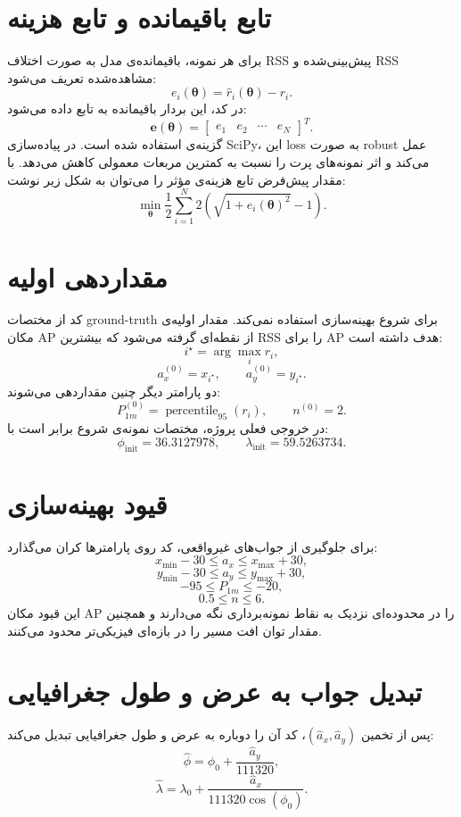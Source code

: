 \documentclass[12pt,a4paper]{article}
\begin{document}
\section{تابع باقیمانده و تابع هزینه}
برای هر نمونه، باقیمانده‌ی مدل به صورت اختلاف RSS پیش‌بینی‌شده و RSS مشاهده‌شده تعریف می‌شود:
\[
e_i(\boldsymbol{\theta})=\hat r_i(\boldsymbol{\theta})-r_i.
\]
در کد، این بردار باقیمانده به تابع
داده می‌شود:
\[
\mathbf{e}(\boldsymbol{\theta}) =
\begin{bmatrix}
e_1 & e_2 & \cdots & e_N
\end{bmatrix}^{T}.
\]
گزینه‌ی
استفاده شده است. در پیاده‌سازی SciPy، این loss به صورت robust عمل می‌کند و اثر نمونه‌های پرت را نسبت به کمترین مربعات معمولی کاهش می‌دهد. با مقدار پیش‌فرض
تابع هزینه‌ی مؤثر را می‌توان به شکل زیر نوشت:
\[
\min_{\boldsymbol{\theta}}
\frac{1}{2}\sum_{i=1}^{N}
2\left(\sqrt{1+e_i(\boldsymbol{\theta})^2}-1\right).
\]

\section{مقداردهی اولیه}
کد از مختصات ground-truth برای شروع بهینه‌سازی استفاده نمی‌کند. مقدار اولیه‌ی مکان AP از نقطه‌ای گرفته می‌شود که بیشترین RSS را برای AP هدف داشته است:
\[
i^\star=\arg\max_i r_i,
\]
\[
a_x^{(0)}=x_{i^\star},\qquad
a_y^{(0)}=y_{i^\star}.
\]
دو پارامتر دیگر چنین مقداردهی می‌شوند:
\[
P_{1m}^{(0)}=\operatorname{percentile}_{95}(r_i),
\qquad
n^{(0)}=2.
\]
در خروجی فعلی پروژه، مختصات نمونه‌ی شروع برابر است با:
\[
\phi_{\text{init}}=36.3127978,\qquad
\lambda_{\text{init}}=59.5263734.
\]

\section{قیود بهینه‌سازی}
برای جلوگیری از جواب‌های غیرواقعی، کد روی پارامترها کران می‌گذارد:
\[
x_{\min}-30 \le a_x \le x_{\max}+30,
\]
\[
y_{\min}-30 \le a_y \le y_{\max}+30,
\]
\[
-95 \le P_{1m} \le -20,
\]
\[
0.5 \le n \le 6.
\]
این قیود مکان AP را در محدوده‌ای نزدیک به نقاط نمونه‌برداری نگه می‌دارند و همچنین مقدار توان افت مسیر را در بازه‌ای فیزیکی‌تر محدود می‌کنند.

\section{تبدیل جواب به عرض و طول جغرافیایی}
پس از تخمین
\((\hat a_x,\hat a_y)\)،
کد آن را دوباره به عرض و طول جغرافیایی تبدیل می‌کند:
\[
\hat\phi=\phi_0+\frac{\hat a_y}{111320},
\]
\[
\hat\lambda=\lambda_0+
\frac{\hat a_x}{111320\cos(\phi_0)}.
\]
\end{document}
